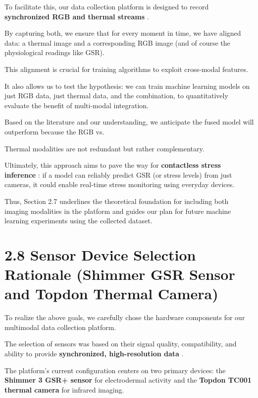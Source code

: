 To facilitate this, our data collection platform is designed to record \textbf{synchronized RGB and thermal streams}
.

By capturing both, we ensure that for every moment in time, we have aligned data: a thermal image and a corresponding RGB image (and of course the physiological readings like GSR).

This alignment is crucial for training algorithms to exploit cross-modal features.

It also allows us to test the hypothesis: we can train machine learning models on just RGB data, just thermal data, and the combination, to quantitatively evaluate the benefit of multi-modal integration.

Based on the literature and our understanding, we anticipate the fused model will outperform because the RGB vs.

Thermal modalities are not redundant but rather complementary.

Ultimately, this approach aims to pave the way for \textbf{contactless stress inference}
: if a model can reliably predict GSR (or stress levels) from just cameras, it could enable real-time stress monitoring using everyday devices.

Thus, Section 2.7 underlines the theoretical foundation for including both imaging modalities in the platform and guides our plan for future machine learning experiments using the collected dataset.

\section{2.8 Sensor Device Selection Rationale (Shimmer GSR Sensor and Topdon Thermal Camera)}

To realize the above goals, we carefully chose the hardware components for our multimodal data collection platform.

The selection of sensors was based on their signal quality, compatibility, and ability to provide \textbf{synchronized, high-resolution data}
.

The platform's current configuration centers on two primary devices: the \textbf{Shimmer 3 GSR+ sensor}
 for electrodermal activity and the \textbf{Topdon TC001 thermal camera}
 for infrared imaging.

